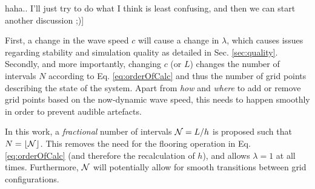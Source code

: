 \documentclass[fleqn]{jaes}
\begin{document}
haha.. I'll just try to do what I think is least confusing, and then we can start another discussion ;)] 

First, a change in the wave speed $c$ will cause a change in $\lambda$, which causes issues regarding stability and simulation quality as detailed in Sec. \ref{sec:quality}. Secondly, and more importantly, changing $c$ (or $L$) changes the number of intervals $N$ according to Eq. \eqref{eq:orderOfCalc} and thus the number of grid points describing the state of the system. Apart from \textit{how} and \textit{where} to add or remove grid points based on the now-dynamic wave speed, this needs to happen smoothly in order to prevent audible artefacts. %

In this work, a \textit{fractional} number of intervals $\mathcal{N} = L / h$ is proposed such that $N = \floor[\Nfrac]$. This removes the need for the flooring operation in Eq. \eqref{eq:orderOfCalc} (and therefore the recalculation of $h$), and allows $\lambda = 1$ at all times. Furthermore, $\mathcal{N}$ will potentially allow for smooth transitions between grid configurations. 
\end{document}
